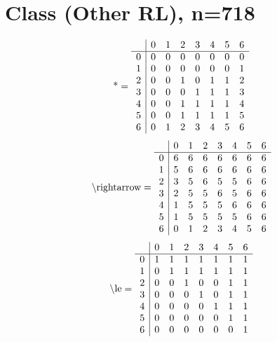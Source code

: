 \documentclass[11pt]{article}
\begin{document}
\section{Class (Other RL), n=718}
\[\text{*} = 
\begin{array}{r | r r r r r r r}
 & 0 & 1 & 2 & 3 & 4 & 5 & 6 \\ \hline
0 & 0 & 0 & 0 & 0 & 0 & 0 & 0 \\
1 & 0 & 0 & 0 & 0 & 0 & 0 & 1 \\
2 & 0 & 0 & 1 & 0 & 1 & 1 & 2 \\
3 & 0 & 0 & 0 & 1 & 1 & 1 & 3 \\
4 & 0 & 0 & 1 & 1 & 1 & 1 & 4 \\
5 & 0 & 0 & 1 & 1 & 1 & 1 & 5 \\
6 & 0 & 1 & 2 & 3 & 4 & 5 & 6 \\
\end{array}
\]
\[\text{\textbackslash rightarrow} = 
\begin{array}{r | r r r r r r r}
 & 0 & 1 & 2 & 3 & 4 & 5 & 6 \\ \hline
0 & 6 & 6 & 6 & 6 & 6 & 6 & 6 \\
1 & 5 & 6 & 6 & 6 & 6 & 6 & 6 \\
2 & 3 & 5 & 6 & 5 & 5 & 6 & 6 \\
3 & 2 & 5 & 5 & 6 & 5 & 6 & 6 \\
4 & 1 & 5 & 5 & 5 & 6 & 6 & 6 \\
5 & 1 & 5 & 5 & 5 & 5 & 6 & 6 \\
6 & 0 & 1 & 2 & 3 & 4 & 5 & 6 \\
\end{array}
\]
\[\text{\textbackslash le} = 
\begin{array}{r | r r r r r r r}
 & 0 & 1 & 2 & 3 & 4 & 5 & 6 \\ \hline
0 & 1 & 1 & 1 & 1 & 1 & 1 & 1 \\
1 & 0 & 1 & 1 & 1 & 1 & 1 & 1 \\
2 & 0 & 0 & 1 & 0 & 0 & 1 & 1 \\
3 & 0 & 0 & 0 & 1 & 0 & 1 & 1 \\
4 & 0 & 0 & 0 & 0 & 1 & 1 & 1 \\
5 & 0 & 0 & 0 & 0 & 0 & 1 & 1 \\
6 & 0 & 0 & 0 & 0 & 0 & 0 & 1 \\
\end{array}
\]
\end{document}
